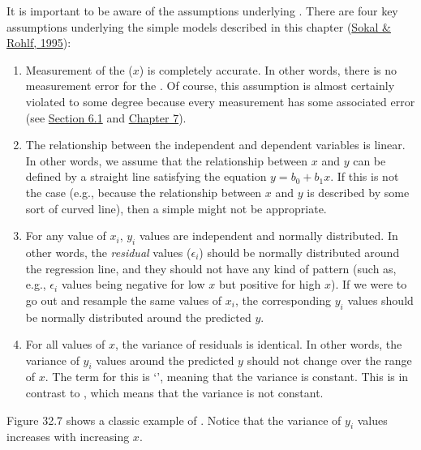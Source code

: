 \documentclass[
  openany]{krantz}
\begin{document}
It is important to be aware of the assumptions underlying .
There are four key assumptions underlying the simple  models described in this chapter (\protect\hyperlink{ref-Sokal1995}{Sokal \& Rohlf, 1995}):

\begin{enumerate}
\def\labelenumi{\arabic{enumi}.}
\item
  Measurement of the  (\(x\)) is completely accurate. In other words, there is no measurement error for the .
  Of course, this assumption is almost certainly violated to some degree because every measurement has some associated error (see \protect\hyperlink{accuracy}{Section 6.1} and \protect\hyperlink{Chapter_7}{Chapter 7}).
\item
  The relationship between the independent and dependent variables is linear.
  In other words, we assume that the relationship between \(x\) and \(y\) can be defined by a straight line satisfying the equation \(y = b_{0} + b_{1}x\).
  If this is not the case (e.g., because the relationship between \(x\) and \(y\) is described by some sort of curved line), then a simple  might not be appropriate.
\item
  For any value of \(x_{i}\), \(y_{i}\) values are independent and normally distributed.
  In other words, the \emph{residual} values (\(\epsilon_{i}\)) should be normally distributed around the regression line, and they should not have any kind of pattern (such as, e.g., \(\epsilon_{i}\) values being negative for low \(x\) but positive for high \(x\)).
  If we were to go out and resample the same values of \(x_{i}\), the corresponding \(y_{i}\) values should be normally distributed around the predicted \(y\).
\item
  For all values of \(x\), the variance of residuals is identical.
  In other words, the variance of \(y_{i}\) values around the predicted \(y\) should not change over the range of \(x\).
  The term for this is `', meaning that the variance is constant.
  This is in contrast to , which means that the variance is not constant.
\end{enumerate}

Figure 32.7 shows a classic example of .
Notice that the variance of \(y_{i}\) values increases with increasing \(x\).
\end{document}
